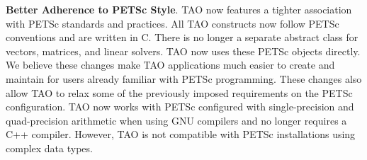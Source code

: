 \vspace{7mm}
\noindent \textbf{Better Adherence to PETSc Style}. TAO now features a tighter association with PETSc standards and practices.  All 
TAO constructs now follow PETSc conventions and are written in C.  There is 
no longer a separate abstract class for vectors, matrices, and linear 
solvers. TAO now uses these PETSc objects directly.  We believe these 
changes make TAO applications much easier to create and maintain for 
users already familiar with PETSc programming. These changes also allow 
TAO to relax some of the previously imposed requirements on the PETSc 
configuration.  TAO now works with PETSc configured with single-precision 
and quad-precision arithmetic when using GNU compilers and no longer 
requires a C++ compiler.  However, TAO is not compatible with PETSc 
installations using complex data types.


